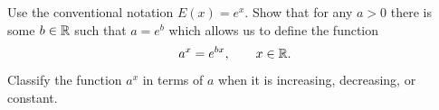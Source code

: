 \begin{exercise}
  \label{ex:hw06:arbitrary-base-exponential}
  Use the conventional notation $E(x)=e^x$. Show that for any $a>0$
  there is some $b\in\mathbb{R}$ such that $a=e^b$ which allows us to define
  the function
  \[
    a^x=e^{bx},\qquad x\in\mathbb{R}.
  \]
  Classify the function $a^x$ in terms of $a$ when it is increasing,
  decreasing, or constant.
\end{exercise}
